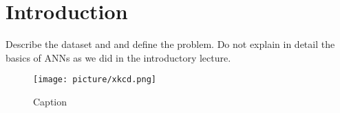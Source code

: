 \section{Introduction}

Describe the dataset and and define the problem. Do not explain in detail the basics of ANNs as we did in the introductory lecture.


\citep{Goodfellow-et-al-2016}

\cite{hope2017, chollet2018}


\begin{figure}[H]
    \centering
    \texttt{[image: picture/xkcd.png]}
    \caption{Caption}
    \label{fig:my_label}
\end{figure}

























